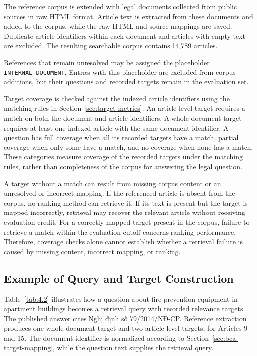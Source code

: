 The reference corpus is extended with legal documents collected from public sources in raw HTML format. Article text is extracted from these documents and added to the corpus, while the raw HTML and source mappings are saved. Duplicate article identifiers within each document and articles with empty text are excluded. The resulting searchable corpus contains 14,789 articles.

References that remain unresolved may be assigned the placeholder \texttt{INTERNAL\_DOCUMENT}. Entries with this placeholder are excluded from corpus additions, but their questions and recorded targets remain in the evaluation set.

Target coverage is checked against the indexed article identifiers using the matching rules in Section~\ref{sec:target-metrics}. An article-level target requires a match on both the document and article identifiers. A whole-document target requires at least one indexed article with the same document identifier. A question has full coverage when all its recorded targets have a match, partial coverage when only some have a match, and no coverage when none has a match. These categories measure coverage of the recorded targets under the matching rules, rather than completeness of the corpus for answering the legal question.

A target without a match can result from missing corpus content or an unresolved or incorrect mapping. If the referenced article is absent from the corpus, no ranking method can retrieve it. If its text is present but the target is mapped incorrectly, retrieval may recover the relevant article without receiving evaluation credit. For a correctly mapped target present in the corpus, failure to retrieve a match within the evaluation cutoff concerns ranking performance. Therefore, coverage checks alone cannot establish whether a retrieval failure is caused by missing content, incorrect mapping, or ranking.


\subsection{Example of Query and Target Construction}

Table~\ref{tab:4.2} illustrates how a question about fire-prevention equipment in apartment buildings becomes a retrieval query with recorded relevance targets. The published answer cites Nghị định số 79/2014/NĐ-CP. Reference extraction produces one whole-document target and two article-level targets, for Articles 9 and 15. The document identifier is normalized according to Section~\ref{sec:bca-target-mapping}, while the question text supplies the retrieval query.

